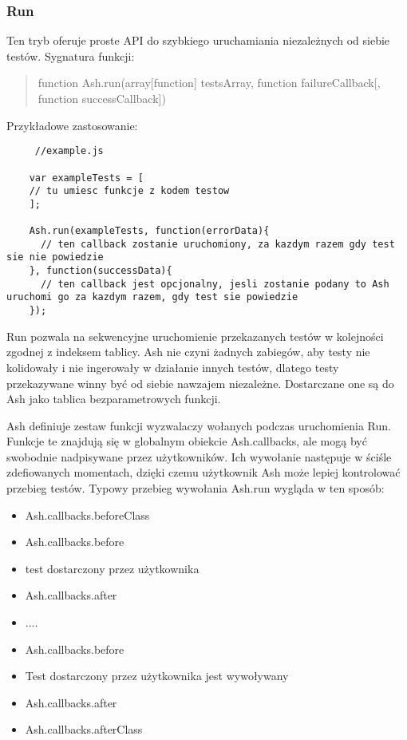 \documentclass[brudnopis]{xmgr}
\begin{document}
\subsubsection{Run}

Ten tryb oferuje proste API do szybkiego uruchamiania niezależnych od siebie testów. Sygnatura funkcji: 

\begin{quote}
function Ash.run(array[function] testsArray, function failureCallback[, function successCallback]) 
\end{quote}

Przykładowe zastosowanie: 

\begin{lstlisting}
     //example.js

    var exampleTests = [
	// tu umiesc funkcje z kodem testow
    ];

    Ash.run(exampleTests, function(errorData){
      // ten callback zostanie uruchomiony, za kazdym razem gdy test sie nie powiedzie
    }, function(successData){
      // ten callback jest opcjonalny, jesli zostanie podany to Ash uruchomi go za kazdym razem, gdy test sie powiedzie
    });
\end{lstlisting}

Run pozwala na sekwencyjne uruchomienie przekazanych testów w kolejności zgodnej z indeksem tablicy. Ash nie czyni żadnych zabiegów, aby testy nie kolidowały i nie ingerowały w działanie innych testów, dlatego testy przekazywane winny być od siebie nawzajem niezależne. Dostarczane one są do Ash jako tablica bezparametrowych funkcji.

Ash definiuje zestaw funkcji wyzwalaczy wołanych podczas uruchomienia Run. Funkcje te znajdują się w globalnym obiekcie Ash.callbacks, ale mogą być swobodnie nadpisywane przez użytkowników. Ich wywołanie następuje w ściśle zdefiowanych momentach, dzięki czemu użytkownik Ash może lepiej kontrolować przebieg testów. Typowy przebieg wywołania Ash.run wygląda w ten sposób:

\begin{itemize}
  \item Ash.callbacks.beforeClass
  \item Ash.callbacks.before
  \item {test dostarczony przez użytkownika}
  \item Ash.callbacks.after
  \item ....
  \item Ash.callbacks.before
  \item Test dostarczony przez użytkownika jest wywoływany
  \item Ash.callbacks.after
  \item Ash.callbacks.afterClass
\end{itemize}
\end{document}
